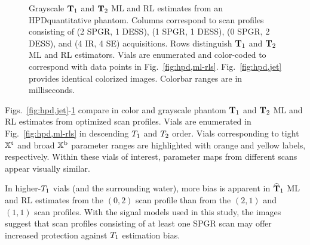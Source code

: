 \begin{figure*} [!tb]
	\centering
	\vspace{0cm}
	\caption{
		Grayscale $\mathbf{T}_1$ and $\mathbf{T}_2$ ML and RL estimates 
		from an HPD\regis quantitative phantom.
		Columns correspond to scan profiles consisting of 
		(2 SPGR, 1 DESS), (1 SPGR, 1 DESS), (0 SPGR, 2 DESS),
		and (4 IR, 4 SE) acquisitions. 
		Rows distinguish $\mathbf{T}_1$ and $\mathbf{T}_2$ ML and RL estimators. 
		Vials are enumerated and color-coded
		to correspond with data points in Fig.~\ref{fig:hpd,ml-rls}.
		Fig.~\ref{fig:hpd,jet} provides identical colorized images.
		Colorbar ranges are in milliseconds.
	}
	\label{fig:hpd,gray}
\end{figure*}

Figs.~\ref{fig:hpd,jet}-\ref{fig:hpd,gray} compare
in color and grayscale  
phantom $\mathbf{T}_1$ and $\mathbf{T}_2$ ML and RL estimates 
from optimized scan profiles. 
Vials are enumerated 
in Fig.~\ref{fig:hpd,ml-rls} 
in descending $T_1$ and $T_2$ order. 
Vials corresponding to tight $\mathbb{X}^\mathrm{t}$ 
and broad $\mathbb{X}^\mathrm{b}$ parameter ranges are highlighted 
with orange and yellow labels, respectively. 
Within these vials of interest, 
parameter maps from different scans appear visually similar.

In higher-$T_1$ vials (and the surrounding water),
more bias is apparent 
in $\widehat{\mathbf{T}}_1$ ML and RL estimates 
from the $(0,2)$ scan profile than 
from the $(2,1)$ and $(1,1)$ scan profiles. 
With the signal models used in this study,
the images suggest that scan profiles consisting 
of at least one SPGR scan may offer increased protection 
against $T_1$ estimation bias.

